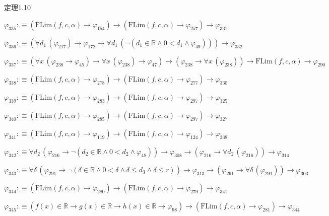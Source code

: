 \begin{fullproof}{定理1.10}
\begin{abbrevlist}
\item $\varphi_{335} :\equiv (\mathrm{FLim}(f,c,\alpha) \to \varphi_{154}) \to (\mathrm{FLim}(f,c,\alpha) \to \varphi_{257}) \to \varphi_{331}$
\item $\varphi_{336} :\equiv (\forall d_{1}\,(\varphi_{217}) \to \varphi_{172} \to \forall d_{1}\,(\neg (d_{1} \in \mathbb{R} \land 0 < d_{1} \land \varphi_{49}))) \to \varphi_{332}$
\item $\varphi_{337} :\equiv (\forall x\,(\varphi_{238} \to \varphi_{45}) \to \forall x\,(\varphi_{238}) \to \varphi_{47}) \to (\varphi_{238} \to \forall x\,(\varphi_{238})) \to \mathrm{FLim}(f,c,\alpha) \to \varphi_{290}$
\item $\varphi_{338} :\equiv (\mathrm{FLim}(f,c,\alpha) \to \varphi_{278}) \to (\mathrm{FLim}(f,c,\alpha) \to \varphi_{277}) \to \varphi_{330}$
\item $\varphi_{339} :\equiv (\mathrm{FLim}(f,c,\alpha) \to \varphi_{283}) \to (\mathrm{FLim}(f,c,\alpha) \to \varphi_{297}) \to \varphi_{325}$
\item $\varphi_{340} :\equiv (\mathrm{FLim}(f,c,\alpha) \to \varphi_{285}) \to (\mathrm{FLim}(f,c,\alpha) \to \varphi_{297}) \to \varphi_{327}$
\item $\varphi_{341} :\equiv (\mathrm{FLim}(f,c,\alpha) \to \varphi_{119}) \to (\mathrm{FLim}(f,c,\alpha) \to \varphi_{124}) \to \varphi_{338}$
\item $\varphi_{342} :\equiv \forall d_{2}\,(\varphi_{216} \to \neg (d_{2} \in \mathbb{R} \land 0 < d_{2} \land \varphi_{48})) \to \varphi_{308} \to (\varphi_{216} \to \forall d_{2}\,(\varphi_{216})) \to \varphi_{314}$
\item $\varphi_{343} :\equiv \forall \delta\,(\varphi_{291} \to \neg (\delta \in \mathbb{R} \land 0 < \delta \land \delta \leq d_{3} \land \delta \leq r)) \to \varphi_{313} \to (\varphi_{291} \to \forall \delta\,(\varphi_{291})) \to \varphi_{303}$
\item $\varphi_{344} :\equiv (\mathrm{FLim}(f,c,\alpha) \to \varphi_{280}) \to (\mathrm{FLim}(f,c,\alpha) \to \varphi_{279}) \to \varphi_{341}$
\item $\varphi_{345} :\equiv (f(x) \in \mathbb{R} \to g(x) \in \mathbb{R} \to h(x) \in \mathbb{R} \to \varphi_{98}) \to (\mathrm{FLim}(f,c,\alpha) \to \varphi_{281}) \to \varphi_{344}$
\end{abbrevlist}
\end{fullproof}
